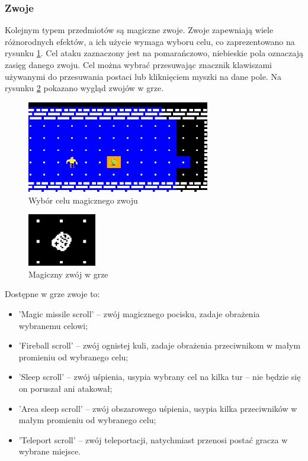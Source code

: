 \documentclass[12pt,twoside]{article}
\begin{document}
\subsubsection{Zwoje}
Kolejnym typem przedmiotów są magiczne zwoje. Zwoje zapewniają wiele różnorodnych efektów, a ich użycie wymaga wyboru celu, co zaprezentowano na rysunku \ref{mygame:targeting}. Cel ataku zaznaczony jest na pomarańczowo, niebieskie pola oznaczają zasięg danego zwoju. Cel można wybrać przesuwając znacznik klawiszami używanymi do przesuwania postaci lub kliknięciem myszki na dane pole. Na rysunku \ref{mygame:scroll} pokazano wygląd zwojów w grze.

\FloatBarrier
\begin{figure}[h]
	\centering
	\includegraphics[width=8cm]{images/mygame/targeting.png}
	\caption{Wybór celu magicznego zwoju}
	\label{mygame:targeting}
\end{figure}
\FloatBarrier

\FloatBarrier
\begin{figure}[h]
	\centering
	\includegraphics[width=3cm]{images/mygame/scroll.png}
	\caption{Magiczny zwój w grze}
	\label{mygame:scroll}
\end{figure}
\FloatBarrier

Dostępne w grze zwoje to: 
\begin{itemize}
	\item 'Magic missile scroll' -- zwój magicznego pocisku, zadaje obrażenia wybranemu celowi;
	\item 'Fireball scroll' -- zwój ognistej kuli, zadaje obrażenia przeciwnikom w małym promieniu od wybranego celu;			
	\item 'Sleep scroll' -- zwój uśpienia, usypia wybrany cel na kilka tur -- nie będzie się on poruszał ani atakował;
	\item 'Area sleep scroll' -- zwój obszarowego uśpienia, usypia kilka przeciwników w małym promieniu od wybranego celu;
	\item 'Teleport scroll' -- zwój teleportacji, natychmiast przenosi postać gracza w wybrane miejsce.	
\end{itemize}
\end{document}
